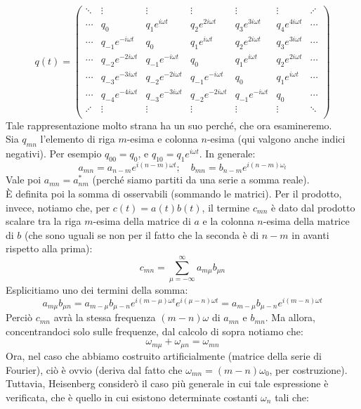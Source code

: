 \documentclass[FisicaTeorica.tex]{subfiles}
\begin{document}
\[
q(t) = \begin{pmatrix}
\ddots & \vdots & \vdots & \vdots & \vdots & \vdots & \iddots\\
\cdots & q_0 & q_1 e^{i\omega t} & q_2 e^{2i\omega t} & q_3 e^{3i\omega t} & q_4 e^{4i\omega t}  & \cdots\\
\cdots & q_{-1}e^{-i\omega t} &  q_0 & q_1 e^{i\omega t} & q_2 e^{2i\omega t} & q_3 e^{3i\omega t}  & \cdots\\
\cdots & q_{-2}e^{-2i\omega t} & q_{-1}e^{-i\omega t} &  q_0 & q_1 e^{i\omega t} & q_2 e^{2i\omega t} & \cdots\\
\cdots & q_{-3}e^{-3i\omega t} & q_{-2}e^{-2i\omega t} & q_{-1}e^{-i\omega t} &  q_0 & q_1 e^{i\omega t}  & \cdots\\
\cdots & q_{-4}e^{-4i\omega t} & q_{-3}e^{-3i\omega t} & q_{-2}e^{-2i\omega t} & q_{-1}e^{-i\omega t} &  q_0 & \cdots\\
\iddots & \vdots & \vdots & \vdots & \vdots & \vdots & \ddots\\
\end{pmatrix}
\]
Tale rappresentazione molto strana ha un suo perché, che ora esamineremo.\\
Sia $q_{mn}$ l'elemento di riga $m$-esima e colonna $n$-esima (qui valgono anche indici negativi). Per esempio $q_{00} = q_0$, e $q_{10} = q_1 e^{i\omega t}$. In generale:
\[
a_{mn} = a_{n-m}e^{i(n-m)\omega t}; \quad b_{mn} = b_{n-m}e^{i(n-m)\omega_t}
\]
Vale poi $a_{mn} = a^*_{nm}$ (perché siamo partiti da una serie a somma reale).\\
È definita poi la somma di osservabili (sommando le matrici). Per il prodotto, invece, notiamo che, per $c(t) = a(t) b(t)$, il termine $c_{mn}$ è dato dal prodotto scalare tra la riga $m$-esima della matrice di $a$ e la colonna $n$-esima della matrice di $b$ (che sono uguali se non per il fatto che la seconda è  di $n-m$ in avanti rispetto alla prima):
\[
c_{mn} = \sum_{\mu=-\infty}^\infty a_{m\mu} b_{\mu n}
\]
Esplicitiamo uno dei termini della somma:
\[
a_{m\mu}b_{\mu n} = a_{m-\mu}b_{\mu-n}e^{i(m-\mu) \omega t} e^{i(\mu-n)\omega t} = a_{m-\mu} b_{\mu-n}e^{i(m-n)\omega t} %
\]
Perciò $c_{mn}$ avrà la stessa frequenza $(m-n)\omega$ di $a_{mn}$ e $b_{mn}$. Ma allora, concentrandoci solo sulle frequenze, dal calcolo di sopra notiamo che:
\[
\omega_{m\mu} + \omega_{\mu n} = \omega_{m n}
\]
Ora, nel caso che abbiamo costruito artificialmente (matrice della serie di Fourier), ciò è ovvio (deriva dal fatto che $\omega_{mn} = (m-n)\omega_0$, per costruzione). Tuttavia, Heisenberg considerò il caso più generale in cui tale espressione è verificata, che è quello in cui esistono determinate costanti $\omega_n$ tali che:
\end{document}
